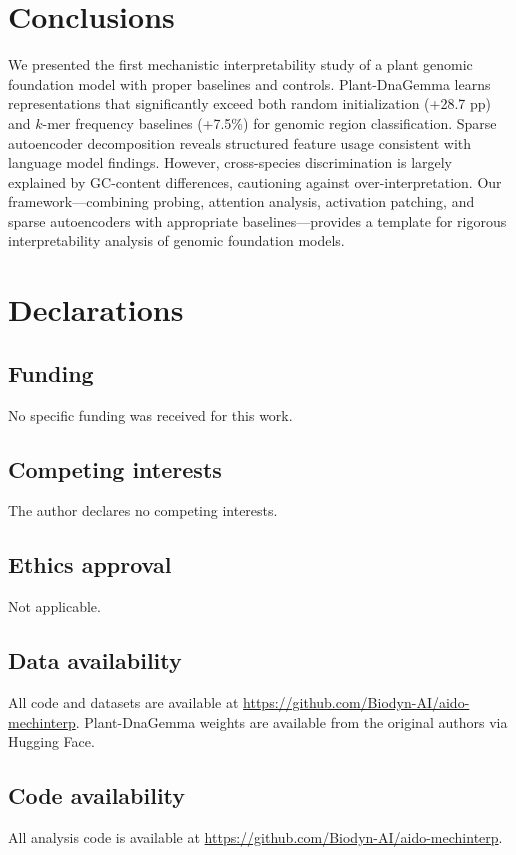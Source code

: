 \documentclass[12pt]{article}
\begin{document}
\section{Conclusions}

We presented the first mechanistic interpretability study of a plant genomic foundation model with proper baselines and controls. Plant-DnaGemma learns representations that significantly exceed both random initialization (+28.7 pp) and $k$-mer frequency baselines (+7.5\%) for genomic region classification. Sparse autoencoder decomposition reveals structured feature usage consistent with language model findings. However, cross-species discrimination is largely explained by GC-content differences, cautioning against over-interpretation. Our framework---combining probing, attention analysis, activation patching, and sparse autoencoders with appropriate baselines---provides a template for rigorous interpretability analysis of genomic foundation models.

\section*{Declarations}

\subsection*{Funding}
No specific funding was received for this work.

\subsection*{Competing interests}
The author declares no competing interests.

\subsection*{Ethics approval}
Not applicable.

\subsection*{Data availability}
All code and datasets are available at \url{https://github.com/Biodyn-AI/aido-mechinterp}. Plant-DnaGemma weights are available from the original authors \citep{zhang2024plantdnagemma} via Hugging Face.

\subsection*{Code availability}
All analysis code is available at \url{https://github.com/Biodyn-AI/aido-mechinterp}.
\end{document}
